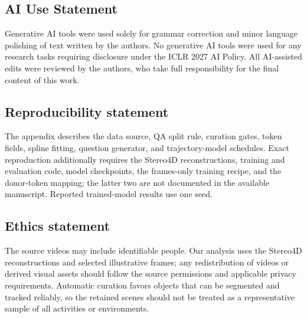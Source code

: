 \documentclass{article} %
\begin{document}
\clearpage
\subsection*{AI Use Statement}

Generative AI tools were used solely for grammar correction and minor language polishing of text written by the authors. No generative AI tools were used for any research tasks requiring disclosure under the ICLR 2027 AI Policy. All AI-assisted edits were reviewed by the authors, who take full responsibility for the final content of this work.

\subsection*{Reproducibility statement}
The appendix describes the data source, QA split rule, curation gates, token
fields, spline fitting, question generator, and trajectory-model schedules.
Exact reproduction additionally requires the Stereo4D reconstructions,
training and evaluation code, model checkpoints, the frames-only training
recipe, and the donor-token mapping; the latter two are not documented in the
available manuscript. Reported trained-model results use one seed.

\subsection*{Ethics statement}
The source videos may include identifiable people. Our analysis uses the
Stereo4D reconstructions and selected illustrative frames; any redistribution
of videos or derived visual assets should follow the source permissions and
applicable privacy requirements. Automatic curation favors objects that can be
segmented and tracked reliably, so the retained scenes should not be treated
as a representative sample of all activities or environments.




\appendix

\end{document}
